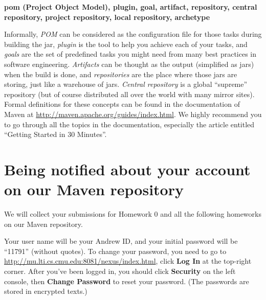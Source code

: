\begin{center}
\textbf{pom (Project Object Model), plugin, goal, artifact, repository, central
repository, project repository, local repository, archetype}
\end{center}

Informally, \emph{POM} can be considered as the configuration file for those
tasks during building the jar, \emph{plugin} is the tool to help you achieve
each of your tasks, and \emph{goals} are the set of predefined tasks you might
need from many best practices in software engineering. \emph{Artifacts} can be
thought as the output (simplified as jars) when the build is done, and
\emph{repositories} are the place where those jars are storing, just like a
warehouse of jars. \emph{Central repository} is a global ``supreme'' repository
(but of course distributed all over the world with many mirror sites). Formal
definitions for these concepts can be found in the documentation of Maven at
\url{http://maven.apache.org/guides/index.html}. We highly recommend you to go
through all the topics in the documentation, especially the article entitled
``Getting Started in 30 Minutes''.

\section{Being notified about your account on our Maven repository}

We will collect your submissions for Homework 0 and all the following homeworks
on our Maven repository.

Your user name will be your Andrew ID, and your initial password will be
``11791'' (without quotes). To change your password, you need to go to
\url{http://mu.lti.cs.cmu.edu:8081/nexus/index.html}, click \textbf{Log In} at
the top-right corner. After you've been logged in, you should click
\textbf{Security} on the left console, then \textbf{Change Password} to reset
your password. (The passwords are stored in encrypted texts.)
